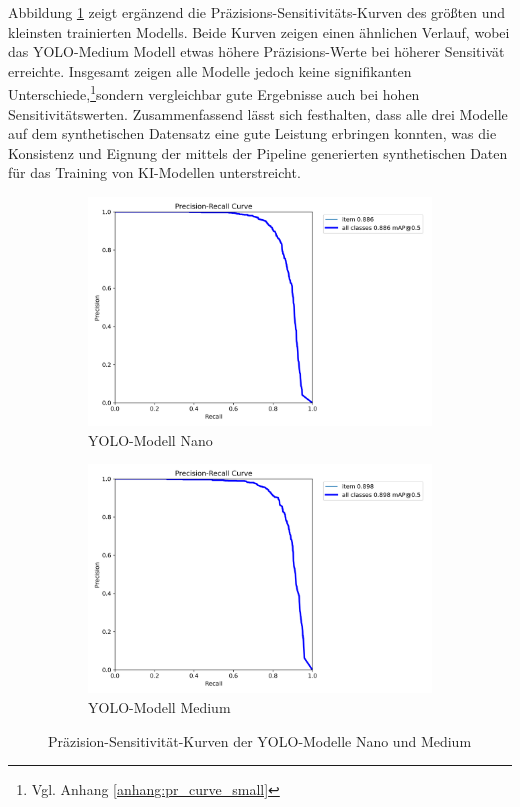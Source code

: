 Abbildung \ref{fig:pr_kurven} zeigt ergänzend die Präzisions-Sensitivitäts-Kurven des größten und kleinsten trainierten Modells. Beide Kurven zeigen einen ähnlichen Verlauf, wobei das \ac{YOLO}-Medium Modell etwas höhere Präzisions-Werte bei höherer Sensitivät erreichte. Insgesamt zeigen alle Modelle jedoch keine signifikanten Unterschiede,\footnote{Vgl. Anhang \ref{anhang:pr_curve_small}}sondern vergleichbar gute Ergebnisse auch bei hohen Sensitivitätswerten. 
Zusammenfassend lässt sich festhalten, dass alle drei Modelle auf dem synthetischen Datensatz eine gute Leistung erbringen konnten, was die Konsistenz und Eignung der mittels der Pipeline generierten synthetischen Daten für das Training von \ac{KI}-Modellen unterstreicht.

\begin{figure}[htb]
    \centering
    \begin{subfigure}{0.49\textwidth}
        \includegraphics[width=\textwidth]{graphics/yolo_eval/model_n/BoxPR_curve.png}
        \caption{\ac{YOLO}-Modell Nano}
    \end{subfigure}
    \hfill
    \begin{subfigure}{0.49\textwidth}
        \includegraphics[width=\textwidth]{graphics/yolo_eval/model_m/BoxPR_curve.png}
        \caption{\ac{YOLO}-Modell Medium}
    \end{subfigure}
    \caption{Präzision-Sensitivität-Kurven der \ac{YOLO}-Modelle Nano und Medium}
    \label{fig:pr_kurven}
\end{figure}


